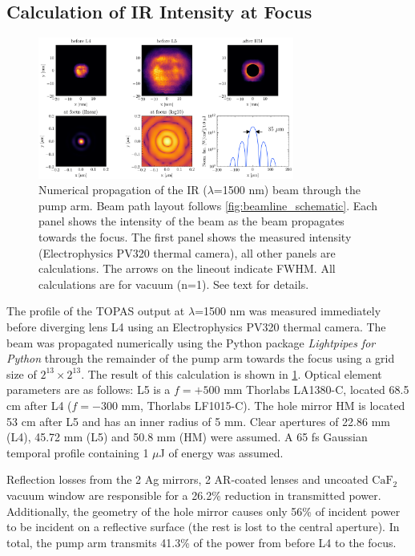 \subsection{Calculation of IR Intensity at Focus}

\begin{figure}
	\centering
	\includegraphics[width=0.75\textwidth]{figures/chap3/pump_on_focus_calculation_8192_inferno.png}
	\caption{Numerical propagation of the IR ($\lambda$=1500 nm) beam through the pump arm. Beam path layout follows \cref{fig:beamline_schematic}. Each panel shows the intensity of the beam as the beam propagates towards the focus. The first panel shows the measured intensity (Electrophysics PV320 thermal camera), all other panels are calculations. The arrows on the lineout indicate FWHM. All calculations are for vacuum (n=1). See text for details.}
	\label{fig:pump_on_focus_calculation}
\end{figure}

The profile of the TOPAS output at $\lambda$=1500 nm was measured immediately before diverging lens L4 using an Electrophysics PV320 thermal camera. The beam was propagated numerically using the Python package \textit{Lightpipes for Python} \cite{vdovinLightPipesPython} through the remainder of the pump arm towards the focus using a grid size of $2^{13}\times2^{13}$. The result of this calculation is shown in \cref{fig:pump_on_focus_calculation}. Optical element parameters are as follows: L5 is a $f = +500 \text{ mm}$ Thorlabs LA1380-C, located 68.5 cm after L4 ($f = -300 \text{ mm}$, Thorlabs LF1015-C). The hole mirror HM is located 53 cm after L5 and has an inner radius of 5 mm. Clear apertures of 22.86 mm (L4), 45.72 mm (L5) and 50.8 mm (HM) were assumed. A 65 fs Gaussian temporal profile containing 1 $\mu$J of energy was assumed.

Reflection losses from the 2 Ag mirrors, 2 AR-coated lenses and uncoated $\text{CaF}_2$ vacuum window are responsible for a 26.2\% reduction in transmitted power. Additionally, the geometry of the hole mirror causes only 56\% of incident power to be incident on a reflective surface (the rest is lost to the central aperture). In total, the pump arm transmits 41.3\% of the power from before L4 to the focus.

